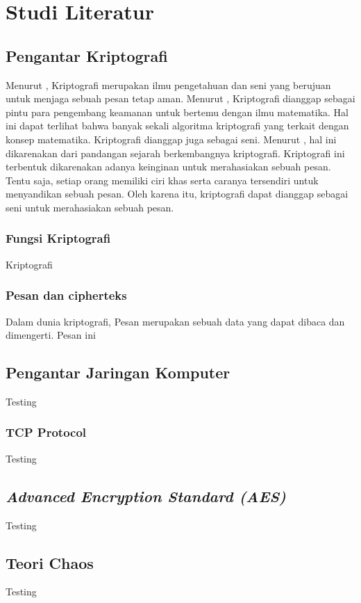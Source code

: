 \chapter{Studi Literatur}

\section{Pengantar Kriptografi}
Menurut \textcite{schneier1996}, Kriptografi merupakan ilmu pengetahuan dan seni yang berujuan untuk menjaga sebuah pesan tetap aman. Menurut \textcite{anderson2008}, Kriptografi dianggap sebagai pintu para pengembang keamanan untuk bertemu dengan ilmu matematika. Hal ini dapat terlihat bahwa banyak sekali algoritma kriptografi yang terkait dengan konsep matematika. Kriptografi dianggap juga sebagai seni. Menurut \textcite{munir2019}, hal ini dikarenakan dari pandangan sejarah berkembangnya kriptografi. Kriptografi ini terbentuk dikarenakan adanya keinginan untuk merahasiakan sebuah pesan. Tentu saja, setiap orang memiliki ciri khas serta caranya tersendiri untuk menyandikan sebuah pesan. Oleh karena itu, kriptografi dapat dianggap sebagai seni untuk merahasiakan sebuah pesan.

\subsection{Fungsi Kriptografi}
Kriptografi 

\subsection{Pesan dan cipherteks}
Dalam dunia kriptografi, Pesan merupakan sebuah data yang dapat dibaca dan dimengerti. Pesan ini 

\section{Pengantar Jaringan Komputer}
Testing 

\subsection{TCP Protocol}
Testing

\section{\emph{Advanced Encryption Standard (AES)}}
Testing

\section{Teori Chaos}
Testing

